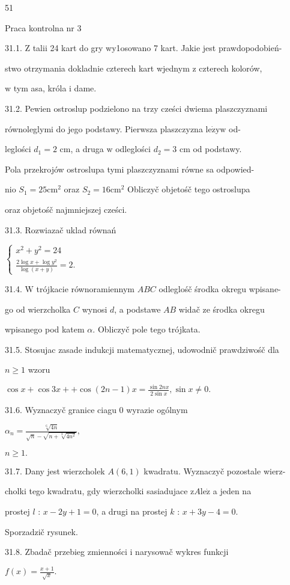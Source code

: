 \documentclass[a4paper,12pt]{article}
\begin{document}
51

Praca kontrolna nr 3

31.1. $\mathrm{Z}$ talii 24 kart do gry wy1osowano 7 kart. Jakie jest prawdopodobień-

stwo otrzymania dokladnie czterech kart wjednym $\mathrm{z}$ czterech kolorów,

$\mathrm{w}$ tym asa, króla $\mathrm{i}$ dame.

31.2. Pewien ostroslup podzielono na trzy cześci dwiema plaszczyznami

równoleglymi do jego podstawy. Pierwsza plaszczyzna $\mathrm{l}\mathrm{e}\dot{\mathrm{z}}\mathrm{y} \mathrm{w}$ od-

leglości $d_{1} = 2$ cm, a druga $\mathrm{w}$ odleglości $d_{2} = 3$ cm od podstawy.

Pola przekrojów ostroslupa tymi plaszczyznami równe sa odpowied-

nio $S_{1}=25\mathrm{c}\mathrm{m}^{2}$ oraz $S_{2}=16\mathrm{c}\mathrm{m}^{2}$ Obliczyč objetośč tego ostroslupa

oraz objetośč najmniejszej cześci.

31.3. Rozwiazač uklad równań

$\left\{\begin{array}{l}
x^{2}+y^{2}=24\\
\frac{2\log x+\log y^{2}}{\log(x+y)}=2.
\end{array}\right.$

31.4. $\mathrm{W}$ trójkacie równoramiennym $ABC$ odleglośč środka okregu wpisane-

go od wierzcholka $C$ wynosi $d$, a podstawe $AB$ widač ze środka okregu

wpisanego pod katem $\alpha$. Obliczyč pole tego trójkata.

31.5. Stosujac zasade indukcji matematycznej, udowodnič prawdziwośč dla

$n\geq 1$ wzoru

$\displaystyle \cos x+\cos 3x++\cos(2n-1)x=\frac{\sin 2nx}{2\sin x},\sin x\neq 0.$

31.6. Wyznaczyč granice ciagu $0$ wyrazie ogólnym

$\displaystyle \alpha_{n}=\frac{\sqrt[6]{4n}}{\sqrt{n}-\sqrt{n+\sqrt[3]{4n^{2}}}},$

$n\geq 1.$

31.7. Dany jest wierzcholek $A(6,1)$ kwadratu. Wyznaczyč pozostale wierz-

cholki tego kwadratu, gdy wierzcholki sasiadujace $\mathrm{z}A\mathrm{l}\mathrm{e}\dot{\mathrm{z}}$ a jeden na

prostej $l$ : $x-2y+1 = 0$, a drugi na prostej $k$ : $x+3y-4 = 0.$

Sporzadzič rysunek.

31.8. Zbadač przebieg zmienności $\mathrm{i}$ narysowač wykres funkcji

$f(x)=\displaystyle \frac{x+1}{\sqrt{x}}.$
\end{document}

